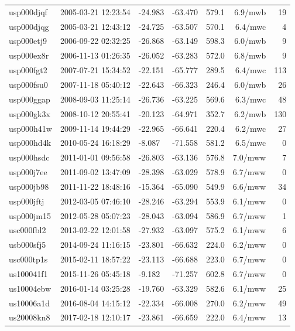 \documentclass[10pt]{article}
\begin{document}
\begin{longtable}{llllrrr}
usp000djqf & 2005-03-21 12:23:54 & -24.983 & -63.470 & 579.1 & 6.9/mwb & 19 \\
usp000djqg & 2005-03-21 12:43:12 & -24.725 & -63.507 & 570.1 & 6.4/mwc & 4 \\
usp000etj9 & 2006-09-22 02:32:25 & -26.868 & -63.149 & 598.3 & 6.0/mwb & 9 \\
usp000ex8r & 2006-11-13 01:26:35 & -26.052 & -63.283 & 572.0 & 6.8/mwb & 9 \\
usp000fgt2 & 2007-07-21 15:34:52 & -22.151 & -65.777 & 289.5 & 6.4/mwc & 113 \\
usp000fsu0 & 2007-11-18 05:40:12 & -22.643 & -66.323 & 246.4 & 6.0/mwb & 26 \\
usp000ggap & 2008-09-03 11:25:14 & -26.736 & -63.225 & 569.6 & 6.3/mwc & 48 \\
usp000gk3x & 2008-10-12 20:55:41 & -20.123 & -64.971 & 352.7 & 6.2/mwb & 130 \\
usp000h41w & 2009-11-14 19:44:29 & -22.965 & -66.641 & 220.4 & 6.2/mwc & 27 \\
usp000hd4k & 2010-05-24 16:18:29 & -8.087 & -71.558 & 581.2 & 6.5/mwc & 0 \\
usp000hsdc & 2011-01-01 09:56:58 & -26.803 & -63.136 & 576.8 & 7.0/mww & 7 \\
usp000j7ee & 2011-09-02 13:47:09 & -28.398 & -63.029 & 578.9 & 6.7/mww & 0 \\
usp000jb98 & 2011-11-22 18:48:16 & -15.364 & -65.090 & 549.9 & 6.6/mww & 34 \\
usp000jftj & 2012-03-05 07:46:10 & -28.246 & -63.294 & 553.9 & 6.1/mww & 0 \\
usp000jm15 & 2012-05-28 05:07:23 & -28.043 & -63.094 & 586.9 & 6.7/mww & 1 \\
usc000fbl2 & 2013-02-22 12:01:58 & -27.932 & -63.097 & 575.2 & 6.1/mww & 6 \\
usb000sfj5 & 2014-09-24 11:16:15 & -23.801 & -66.632 & 224.0 & 6.2/mww & 0 \\
usc000tp1s & 2015-02-11 18:57:22 & -23.113 & -66.688 & 223.0 & 6.7/mww & 0 \\
us100041f1 & 2015-11-26 05:45:18 & -9.182 & -71.257 & 602.8 & 6.7/mww & 0 \\
us10004ebw & 2016-01-14 03:25:28 & -19.760 & -63.329 & 582.6 & 6.1/mww & 25 \\
us10006a1d & 2016-08-04 14:15:12 & -22.334 & -66.008 & 270.0 & 6.2/mww & 49 \\
us20008kn8 & 2017-02-18 12:10:17 & -23.861 & -66.659 & 222.0 & 6.4/mww & 13 \\

\end{longtable}
\end{document}

